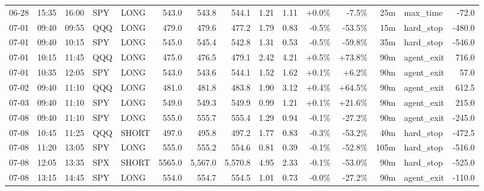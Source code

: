 \documentclass[11pt,a4paper,twoside]{article}
\begin{document}
\begin{landscape}
\begin{center}
\begin{longtable}{>{\color{txtmain}}l l l l l r r r r r r r r >{\color{txtmain}}l r}
06-28 & 15:35 & 16:00 & SPY & LONG & 543.0 & 543.8 & 544.1 & 1.21 & 1.11 & \textcolor{wingreen}{+0.0\%} & \textcolor{lossred}{-7.5\%} & 25m & max\_time & \textcolor{lossred}{-72.0} \\
07-01 & 09:40 & 09:55 & QQQ & LONG & 479.0 & 479.6 & 477.2 & 1.79 & 0.83 & \textcolor{lossred}{-0.5\%} & \textcolor{lossred}{-53.5\%} & 15m & hard\_stop & \textcolor{lossred}{-480.0} \\
07-01 & 09:40 & 10:15 & SPY & LONG & 545.0 & 545.4 & 542.8 & 1.31 & 0.53 & \textcolor{lossred}{-0.5\%} & \textcolor{lossred}{-59.8\%} & 35m & hard\_stop & \textcolor{lossred}{-546.0} \\
07-01 & 10:15 & 11:45 & QQQ & LONG & 475.0 & 476.5 & 479.1 & 2.42 & 4.21 & \textcolor{wingreen}{+0.5\%} & \textcolor{wingreen}{+73.8\%} & 90m & agent\_exit & \textcolor{wingreen}{716.0} \\
07-01 & 10:35 & 12:05 & SPY & LONG & 543.0 & 543.6 & 544.1 & 1.52 & 1.62 & \textcolor{wingreen}{+0.1\%} & \textcolor{wingreen}{+6.2\%} & 90m & agent\_exit & \textcolor{wingreen}{57.0} \\
07-02 & 09:40 & 11:10 & QQQ & LONG & 481.0 & 481.8 & 483.8 & 1.90 & 3.12 & \textcolor{wingreen}{+0.4\%} & \textcolor{wingreen}{+64.5\%} & 90m & agent\_exit & \textcolor{wingreen}{612.5} \\
07-03 & 09:40 & 11:10 & SPY & LONG & 549.0 & 549.3 & 549.9 & 0.99 & 1.21 & \textcolor{wingreen}{+0.1\%} & \textcolor{wingreen}{+21.6\%} & 90m & agent\_exit & \textcolor{wingreen}{215.0} \\
07-08 & 09:40 & 11:10 & SPY & LONG & 555.0 & 555.7 & 555.4 & 1.29 & 0.94 & \textcolor{lossred}{-0.1\%} & \textcolor{lossred}{-27.2\%} & 90m & agent\_exit & \textcolor{lossred}{-245.0} \\
07-08 & 10:45 & 11:25 & QQQ & SHORT & 497.0 & 495.8 & 497.2 & 1.77 & 0.83 & \textcolor{lossred}{-0.3\%} & \textcolor{lossred}{-53.2\%} & 40m & hard\_stop & \textcolor{lossred}{-472.5} \\
07-08 & 11:20 & 13:05 & SPY & LONG & 555.0 & 555.2 & 554.6 & 0.81 & 0.39 & \textcolor{lossred}{-0.1\%} & \textcolor{lossred}{-52.8\%} & 105m & hard\_stop & \textcolor{lossred}{-516.0} \\
07-08 & 12:05 & 13:35 & SPX & SHORT & 5565.0 & 5,567.0 & 5,570.8 & 4.95 & 2.33 & \textcolor{lossred}{-0.1\%} & \textcolor{lossred}{-53.0\%} & 90m & hard\_stop & \textcolor{lossred}{-525.0} \\
07-08 & 13:15 & 14:45 & SPY & LONG & 554.0 & 554.7 & 554.5 & 1.01 & 0.73 & \textcolor{lossred}{-0.0\%} & \textcolor{lossred}{-27.2\%} & 90m & agent\_exit & \textcolor{lossred}{-110.0} \\

\end{longtable}
\end{center}
\end{landscape}
\end{document}
